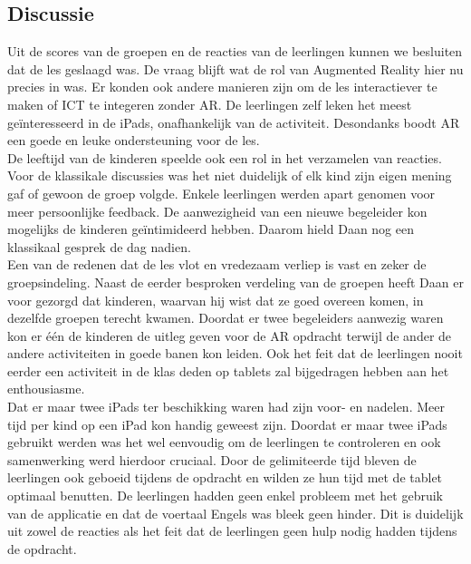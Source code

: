 \documentclass[pdftex,a4paper,12pt,twoside]{report}
\begin{document}
\subsection{Discussie}

Uit de scores van de groepen en de reacties van de leerlingen kunnen we besluiten dat de les geslaagd was. De vraag blijft wat de rol van Augmented Reality hier nu precies in was. Er konden ook andere manieren zijn om de les interactiever te maken of ICT te integeren zonder AR. De leerlingen zelf leken het meest ge\"interesseerd in de iPads, onafhankelijk van de activiteit. Desondanks boodt AR een goede en leuke ondersteuning voor de les.\\

De leeftijd van de kinderen speelde ook een rol in het verzamelen van reacties. Voor de klassikale discussies was het niet duidelijk of elk kind zijn eigen mening gaf of gewoon de groep volgde. Enkele leerlingen werden apart genomen voor meer persoonlijke feedback. De aanwezigheid van een nieuwe begeleider kon mogelijks de kinderen ge\"intimideerd hebben. Daarom hield Daan nog een klassikaal gesprek de dag nadien.\\

Een van de redenen dat de les vlot en vredezaam verliep is vast en zeker de groepsindeling. Naast de eerder besproken verdeling van de groepen heeft Daan er voor gezorgd dat kinderen, waarvan hij wist dat ze goed overeen komen, in dezelfde groepen terecht kwamen. Doordat er twee begeleiders aanwezig waren kon er \'e\'en de kinderen de uitleg geven voor de AR opdracht terwijl de ander de andere activiteiten in goede banen kon leiden. Ook het feit dat de leerlingen nooit eerder een activiteit in de klas deden op tablets zal bijgedragen hebben aan het enthousiasme.\\

Dat er maar twee iPads ter beschikking waren had zijn voor- en nadelen. Meer tijd per kind op een iPad kon handig geweest zijn. Doordat er maar twee iPads gebruikt werden was het wel eenvoudig om de leerlingen te controleren en ook samenwerking werd hierdoor cruciaal. Door de gelimiteerde tijd bleven de leerlingen ook geboeid tijdens de opdracht en wilden ze hun tijd met de tablet optimaal benutten. De leerlingen hadden geen enkel probleem met het gebruik van de applicatie en dat de voertaal Engels was bleek geen hinder. Dit is duidelijk uit zowel de reacties als het feit dat de leerlingen geen hulp nodig hadden tijdens de opdracht.\\	
\end{document}
